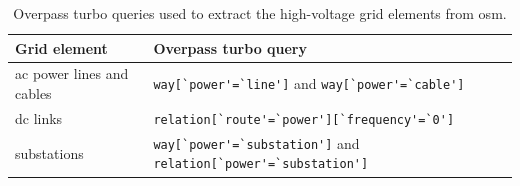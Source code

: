 \documentclass[fleqn,10pt]{wlscirep}
\newcommand{\colorcode}[1]{\colorbox{gray!20}{\lstinline|#1|}}
\begin{document}



\begin{table}[!htbp]
    \centering
    \begin{tabular}{|p{}|p{}|}
    \hline
    \textbf{Grid element} & \textbf{Overpass turbo query}  \\
    \hline
    \acrshort{ac} power lines and cables & \colorcode{way[`power'=`line']} and \colorcode{way[`power'=`cable']} \\
    \hline
    \acrshort{dc} links & \colorcode{relation[`route'=`power'][`frequency'=`0']} \\
    \hline
    substations & \colorcode{way[`power'=`substation']} and \colorcode{relation[`power'=`substation']} \\
    \hline
    \end{tabular}
    \caption{Overpass turbo queries used to extract the high-voltage grid elements from \acrshort{osm}.}
    \label{tab:overpass_queries}
\end{table}
\end{document}
